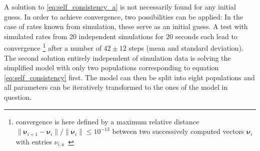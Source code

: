 A solution to \eqref{eq:self_consistency_a} is not necessarily found for any initial guess. 
In order to achieve convergence, two possibilities 
can be applied: In the case of rates known from simulation, these serve as an initial guess. 
A test with simulated rates from 20 independent simulations for 20 seconds each lead to convergence%
\footnote{convergence is here defined by a maximum relative distance 
    $\|\boldsymbol\nu_{i + 1} - \boldsymbol\nu_i\| / \|\boldsymbol\nu_i\| \le 10^{-13}$ between two 
    successively computed vectors $\boldsymbol\nu_i$ with entries $\nu_{i, a}$~\cite{scipy}} %
after a number of $42 \pm 12$ steps (mean and standard deviation). 
The second solution entirely independent of simulation data is solving the simplified model 
with only two populations corresponding to equation \eqref{eq:self_consistency} first.
The model can then be split 
into eight populations and all parameters can be iteratively transformed to the ones of the 
model in question. 

\FloatBarrier
